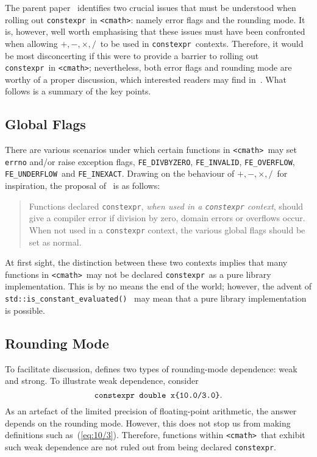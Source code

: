 \documentclass[prd,twocolumn,amsmath,amssymb,nofootinbib,eqsecnum]{revtex4-1}
\newcommand{\constexpr}{\code{constexpr}\xspace}
\newcommand{\code}[1]{{\tt #1}}
\newcommand{\header}[1]{{\tt <#1>}}
\newcommand{\cmath}{\header{cmath}}
\newcommand{\FEINVALID}{{\tt FE\_INVALID}}
\newcommand{\FEDIVBYZERO}{{\tt FE\_DIVBYZERO}}
\newcommand{\FEINEXACT}{{\tt FE\_INEXACT}}
\newcommand{\FEUNDERFLOW}{{\tt FE\_UNDERFLOW}}
\newcommand{\FEOVERFLOW}{{\tt FE\_OVERFLOW}}
\newcommand{\Operators}{\ensuremath{+,-,\times,/}}
\newcommand{\eq}[1]{(\ref{eq:#1})}
\begin{document}
The parent paper~\cite{Rosten-constexpr} identifies two crucial issues that must be understood when rolling out \constexpr\ in \cmath: namely error flags and the rounding mode. It is, however, well worth emphasising that these issues must have been confronted when allowing \Operators\ to be used in \constexpr\ contexts. Therefore, it would be most disconcerting if this were to provide a barrier to rolling out \constexpr\ in \cmath; nevertheless, both error flags and rounding mode are worthy of a proper discussion, which interested readers may find in~\cite{Rosten-constexpr}. What follows is a summary of the key points.

\subsection{Global Flags}

There are various scenarios under which certain functions in \cmath\ may set \code{errno} and/or raise exception flags, \FEDIVBYZERO, \FEINVALID, \FEOVERFLOW, \FEUNDERFLOW\ and
\FEINEXACT. Drawing on the behaviour of \Operators\ for inspiration, the proposal of~\cite{Rosten-constexpr} is as follows:
\begin{quotation}
	Functions declared \constexpr, \emph{when used in a \constexpr
context}, should give a compiler error if division by zero, domain errors or
overflows occur. When not used in a \constexpr context, the various global
flags should be set as normal.
\end{quotation}
At first sight, the distinction between these two contexts implies that many functions in \cmath\ may not be declared \constexpr\ as a pure library implementation. This is by no means the end of the world; however, the advent of \code{std::is\_constant\_evaluated()}~\cite{ConstEval}
may mean that a pure library implementation is possible.

\subsection{Rounding Mode}
\label{sec:rounding}

To facilitate discussion, \cite{Rosten-constexpr} defines two types of rounding-mode dependence: weak and strong. To illustrate weak dependence, consider
\begin{equation}
	\mbox{\code{constexpr double x\{10.0/3.0\}}}.
\label{eq:10/3}
\end{equation}
As an artefact of the limited precision of floating-point arithmetic, the answer depends on the rounding mode. However, this does not stop us from making definitions such as~\eq{10/3}. Therefore, functions  within \cmath\ that exhibit such weak dependence are not ruled out from being declared \constexpr.
\end{document}

